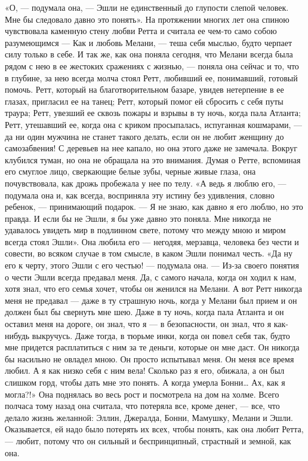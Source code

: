 «О, — подумала она, — Эшли не единственный до глупости слепой человек. Мне бы следовало давно это понять».
На протяжении многих лет она спиною чувствовала каменную стену любви Ретта и считала ее чем-то само собою разумеющимся — Как и любовь Мелани, — теша себя мыслью, будто черпает силу только в себе. И так же, как она поняла сегодня, что Мелани всегда была рядом с нею в ее жестоких сражениях с жизнью, — поняла она сейчас и то, что в глубине, за нею всегда молча стоял Ретт, любивший ее, понимавший, готовый помочь. Ретт, который на благотворительном базаре, увидев нетерпение в ее глазах, пригласил ее на танец; Ретт, который помог ей сбросить с себя путы траура; Ретт, увезший ее сквозь пожары и взрывы в ту ночь, когда пала Атланта; Ретт, утешавший ее, когда она с криком просыпалась, испуганная кошмарами, — да ни один мужчина не станет такого делать, если он не любит женщину до самозабвения!
С деревьев на нее капало, но она этого даже не замечала. Вокруг клубился туман, но она не обращала на это внимания. Думая о Ретте, вспоминая его смуглое лицо, сверкающие белые зубы, черные живые глаза, она почувствовала, как дрожь пробежала у нее по телу.
«А ведь я люблю его, — подумала она и, как всегда, восприняла эту истину без удивления, словно ребенок, — принимающий подарок. — Я не знаю, как давно я его люблю, но это правда. И если бы не Эшли, я бы уже давно это поняла. Мне никогда не удавалось увидеть мир в подлинном свете, потому что между мною и миром всегда стоял Эшли».
Она любила его — негодяя, мерзавца, человека без чести и совести, во всяком случае в том смысле, в каком Эшли понимал честь. «Да ну его к черту, этого Эшли с его честью! — подумала она. — Из-за своего понятия о чести Эшли всегда предавал меня. Да, с самого начала, когда он ходил к нам, хотя знал, что его семья хочет, чтобы он женился на Мелани. А вот Ретт никогда меня не предавал — даже в ту страшную ночь, когда у Мелани был прием и он должен был бы свернуть мне шею. Даже в ту ночь, когда пала Атланта и он оставил меня на дороге, он знал, что я — в безопасности, он знал, что я как-нибудь выкручусь. Даже тогда, в тюрьме инки, когда он повел себя так, будто мне придется расплатиться с ним за те деньги, которые он мне даст. Он никогда бы насильно не овладел мною. Он просто испытывал меня. Он меня все время любил. А я как низко себя с ним вела! Сколько раз я его, обижала, а он был слишком горд, чтобы дать мне это понять. А когда умерла Бонни… Ах, как я могла?!» Она поднялась во весь рост и посмотрела на дом на холме. Всего полчаса тому назад она считала, что потеряла все, кроме денег, — все, что делало жизнь желанной: Эллин, Джералда, Бонни, Мамушку, Мелани и Эшли. Оказывается, ей надо было потерять их всех, чтобы понять, как она любит Ретта, — любит, потому что он сильный и беспринципный, страстный и земной, как она.
